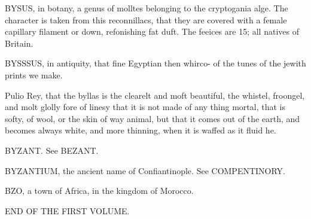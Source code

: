 BYSUS, in botany, a genus of molltes belonging to the cryptogania alge. The character is taken from this reconnillacs, that they are covered with a female capillary filament or down, refonishing fat duft. The feeices are 15; all natives of Britain.\par\medskip
BYSSSUS, in antiquity, that fine Egyptian then whirco- of the tunes of the jewith prints we make.\par\medskip
Pulio Rey, that the byllas is the clearelt and moft beautiful, the whistel, froongel, and molt glolly fore of linesy that it is not made of any thing mortal, that is softy, of wool, or the skin of way animal, but that it comes out of the earth, and becomes always white, and more thinning, when it is waffed as it fluid he.\par\medskip
BYZANT. See BEZANT.\par\medskip
BYZANTIUM, the ancient name of Confiantinople. See COMPENTINORY.\par\medskip
BZO, a town of Africa, in the kingdom of Morocco.\par\medskip
END OF THE FIRST VOLUME.\par\medskip
